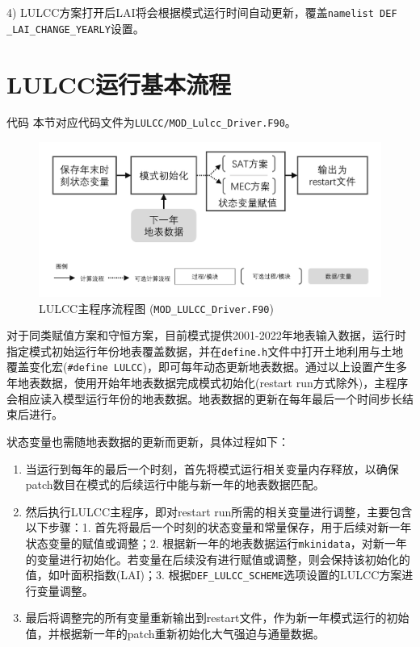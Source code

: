 4) LULCC方案打开后LAI将会根据模式运行时间自动更新，覆盖\texttt{namelist DEF\- \_LAI\_CHANGE\_YEARLY}设置。


\section{LULCC运行基本流程}
\begin{mymdframed}{代码}
本节对应代码文件为\texttt{LULCC/MOD\_Lulcc\_Driver.F90}。
\end{mymdframed}

{
\begin{figure}[htbp]
\centering
\includegraphics[width=0.85\columnwidth]{Figures/土地利用与土地覆盖变化模拟/LULCCDRIVER流程图.jpg}
\caption{LULCC主程序流程图 (\texttt{MOD\_LULCC\_Driver.F90})}
\label{fig:LULCC主程序流程图}
\end{figure}
}

对于同类赋值方案和守恒方案，目前模式提供2001-2022年地表输入数据，运行时指定模式初始运行年份地表覆盖数据，并在\texttt{define.h}文件中打开土地利用与土地覆盖变化宏(\texttt{\#define LULCC})，即可每年动态更新地表数据。通过以上设置产生多年地表数据，使用开始年地表数据完成模式初始化(restart run方式除外)，主程序会相应读入模型运行年份的地表数据。地表数据的更新在每年最后一个时间步长结束后进行。

状态变量也需随地表数据的更新而更新，具体过程如下：

\begin{enumerate}
\item 当运行到每年的最后一个时刻，首先将模式运行相关变量内存释放，以确保patch数目在模式的后续运行中能与新一年的地表数据匹配。

\item 然后执行LULCC主程序，即对restart run所需的相关变量进行调整，主要包含以下步骤：1. 首先将最后一个时刻的状态变量和常量保存，用于后续对新一年状态变量的赋值或调整；2. 根据新一年的地表数据运行\texttt{mkinidata}，对新一年的变量进行初始化。若变量在后续没有进行赋值或调整，则会保持该初始化的值，如叶面积指数(LAI)；3. 根据\texttt{DEF\_LULCC\_SCHEME}选项设置的LULCC方案进行变量调整。

\item 最后将调整完的所有变量重新输出到restart文件，作为新一年模式运行的初始值，并根据新一年的patch重新初始化大气强迫与通量数据。
\end{enumerate}

